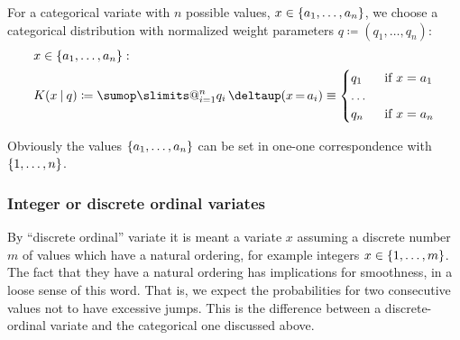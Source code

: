 \documentclass[\ifafour a4paper,12pt,\else a5paper,10pt,\fi%
onecolumn,oneside,article,%
british%
]{memoir}
\makeatletter
\theoremstyle{remark}
\theoremstyle{innote}
\def\sum{\DOTSI\sumop\slimits@}
\newcommand*{\delt}{\deltaup}%
\newcommand*{\defd}{\coloneqq}
\DeclarePairedDelimiter\set{\{}{\}} %
\renewcommand*{\|}[1][]{\nonscript\:#1\vert\nonscript\:\mathopen{}}
\newcommand*{\mo}[1][=]{\mathord{\,#1\,}}
\makeatother
\begin{document}
For a categorical variate with $n$ possible values, $x \in \set{a_{1}, \dotsc, a_{n}}$, we choose a categorical distribution with normalized weight parameters $q \defd (q_{1}, \dotsc, q_{n})$:
\begin{equation}
  \label{eq:K_cat}
  \begin{split}
    &x \in \set{a_{1}, \dotsc, a_{n}}:
    \\
  &K(x \| q) \defd \sum_{i=1}^{n} q_{i}\,\delt(x\mo a_{i}) \equiv
  \begin{cases}
    q_{1} &\text{ if $x=a_{1}$}\\\dotso&\\
    q_{n} &\text{ if $x=a_{n}$}
  \end{cases}
\end{split}
\end{equation}

Obviously the values $\set{a_{1}, \dotsc, a_{n}}$ can be set in one-one correspondence with $\set{1, \dotsc, n}$.

\subsubsection{Integer or discrete ordinal variates}
\label{sec:variates_ordinal}

By \enquote{discrete ordinal} variate it is meant a variate $x$ assuming a discrete number $m$ of values which have a natural ordering, for example integers $x \in \set{1,\dotsc, m}$. The fact that they have a natural ordering has implications for smoothness, in a loose sense of this word. That is, we expect the probabilities for two consecutive values not to have excessive jumps. This is the difference between a discrete-ordinal variate and the categorical one discussed above.
\end{document}
